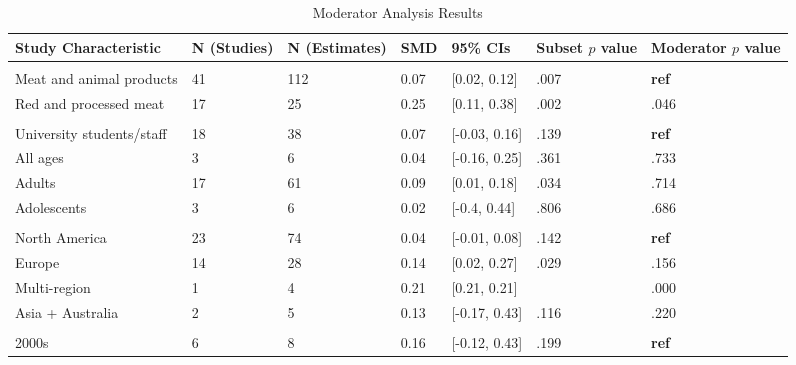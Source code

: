 \documentclass[sn-nature,referee,lineno,pdflatex]{sn-jnl}
\begin{document}
\begin{table}[!ht]

\caption{\label{tab:table_S1}Moderator Analysis Results}
\begin{tabular}[t]{lllll>{\raggedright\arraybackslash}p{2 cm}>{\raggedright\arraybackslash}p{2 cm}}
\toprule
Study Characteristic & N (Studies) & N (Estimates) & SMD & 95\% CIs & Subset $p$ value & Moderator $p$ value\\
\midrule
\addlinespace[0.3em]
\multicolumn{7}{l}{\textbf{Outcome}}\\
\hspace{1em}Meat and animal products & 41 & 112 & 0.07 & {}[0.02, 0.12] & .007 & \textbf{ref}\\
\hspace{1em}Red and processed meat & 17 & 25 & 0.25 & {}[0.11, 0.38] & .002 & .046\\
\addlinespace[0.3em]
\multicolumn{7}{l}{\textbf{Population}}\\
\hspace{1em}University students/staff & 18 & 38 & 0.07 & {}[-0.03, 0.16] & .139 & \textbf{ref}\\
\hspace{1em}All ages & 3 & 6 & 0.04 & {}[-0.16, 0.25] & .361 & .733\\
\hspace{1em}Adults & 17 & 61 & 0.09 & {}[0.01, 0.18] & .034 & .714\\
\hspace{1em}Adolescents & 3 & 6 & 0.02 & {}[-0.4, 0.44] & .806 & .686\\
\addlinespace[0.3em]
\multicolumn{7}{l}{\textbf{Region}}\\
\hspace{1em}North America & 23 & 74 & 0.04 & {}[-0.01, 0.08] & .142 & \textbf{ref}\\
\hspace{1em}Europe & 14 & 28 & 0.14 & {}[0.02, 0.27] & .029 & .156\\
\hspace{1em}Multi-region & 1 & 4 & 0.21 & {}[0.21, 0.21] & 0 & .000\\
\hspace{1em}Asia + Australia & 2 & 5 & 0.13 & {}[-0.17, 0.43] & .116 & .220\\
\addlinespace[0.3em]
\multicolumn{7}{l}{\textbf{Publication Decade}}\\
\hspace{1em}2000s & 6 & 8 & 0.16 & {}[-0.12, 0.43] & .199 & \textbf{ref}\\

\end{tabular}
\end{table}
\end{document}
